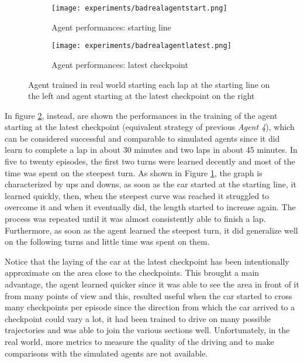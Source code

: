 \begin{figure}[h]
  \centering
  \begin{subfigure}{.5\linewidth}
      \centering
      \texttt{[image: experiments/badrealagentstart.png]}
      \caption{Agent performances: starting line}\label{fig:rlen}
  \end{subfigure}%
      \hfill
  \begin{subfigure}{.5\linewidth}
      \centering
      \texttt{[image: experiments/badrealagentlatest.png]}
      \caption{Agent performances: latest checkpoint}\label{fig:rrew}
  \end{subfigure}
  \caption{Agent trained in real world starting each lap at the starting line on the left and agent starting at the latest checkpoint on the right}
  \label{fig:realresult}
\end{figure}

In figure \ref{fig:rrew}, instead, are shown the performances in the training of the agent starting at the latest checkpoint (equivalent strategy of previous \textit{Agent 4}), which can be considered successful and comparable to simulated agents since it did learn to complete a lap in about 30 minutes and two laps in about 45 minutes. In five to twenty episodes, the first two turns were learned decently and most of the time was spent on the steepest turn. As shown in Figure \ref{fig:rlen}, the graph is characterized by ups and downs, as soon as the car started at the starting line, it learned quickly, then, when the steepest curve was reached it struggled to overcome it and when it eventually did, the length started to increase again. The process was repeated until it was almost consistently able to finish a lap. Furthermore, as soon as the agent learned the steepest turn, it did generalize well on the following turns and little time was spent on them.

Notice that the laying of the car at the latest checkpoint has been intentionally approximate on the area close to the checkpoints. This brought a main advantage, the agent learned quicker since it was able to see the area in front of it from many points of view and this, resulted useful when the car started to cross many checkpoints per episode since the direction from which the car arrived to a checkpoint could vary a lot, it had been trained to drive on many possible trajectories and was able to join the various sections well. Unfortunately, in the real world, more metrics to measure the quality of the driving and to make comparisons with the simulated agents are not available. 

